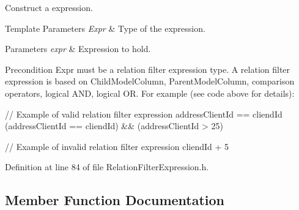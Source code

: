 Construct a expression. 


\begin{DoxyTemplParams}{Template Parameters}
{\em Expr} & Type of the expression. \\
\hline
\end{DoxyTemplParams}

\begin{DoxyParams}{Parameters}
{\em expr} & Expression to hold. \\
\hline
\end{DoxyParams}
\begin{DoxyPrecond}{Precondition}
Expr must be a relation filter expression type. A relation filter expression is based on Child\+Model\+Column, Parent\+Model\+Column, comparison operators, logical A\+ND, logical OR. For example (see code above for details)\+: 
\begin{DoxyCode}
\textcolor{comment}{// Example of valid relation filter expression}
addressClientId == cliendId
(addressClientId == cliendId) && (addressClientId > 25)

\textcolor{comment}{// Example of invalid relation filter expression}
cliendId + 5
\end{DoxyCode}
 
\end{DoxyPrecond}


Definition at line 84 of file Relation\+Filter\+Expression.\+h.



\subsection{Member Function Documentation}
